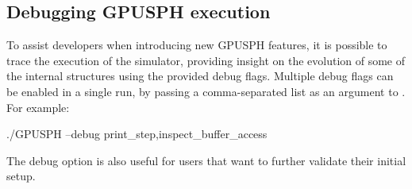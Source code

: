 \documentclass{../GPUSPHtemplate}
\begin{document}
\subsection{Debugging GPUSPH execution}

To assist developers when introducing new GPUSPH features, it is
possible to trace the execution of the simulator, providing insight on
the evolution of some of the internal structures using the provided
debug flags. Multiple debug flags can be enabled in a single run, by
passing a comma-separated list as an argument to . For
example:
\begin{shellcode}
./GPUSPH --debug print_step,inspect_buffer_access
\end{shellcode}

The  debug option is also useful for users
that want to further validate their initial setup.
\end{document}
